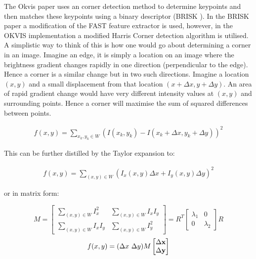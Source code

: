 \documentclass[11pt,twoside]{report}
\begin{document}
The Okvis \cite{Okvis_1} paper uses an corner detection method to determine keypoints and then matches these keypoints using a binary descriptor (BRISK \cite{BRISK}). In the BRISK paper a modification of the FAST feature extractor is used, however, in the OKVIS implementation a modified Harris Corner detection algorithm is utilised. A simplistic way to think of this is how one would go about determining a corner in an image. Imagine an edge, it is simply a location on an image where the brightness gradient changes rapidly in one direction (perpendicular to the edge). Hence a corner is a similar change but in two such directions. Imagine a location $(x,y)$ and a small displacement from that location $(x+ \Delta x, y + \Delta y)$. An area of rapid gradient change would have very different intensity values at $(x,y)$ and surrounding points. Hence a corner will maximise the sum of squared differences between points.

\begin{equation}
\begin{aligned}
f(x,y) = \sum_{x_{k},y_{k} \in W} (I(x_{k},y_{k}) - I(x_{k} + \Delta x,y_{k} + \Delta y))^{2}
\end{aligned}
\end{equation}

This can be further distilled by the Taylor expansion to:

\begin{equation}
\begin{aligned}
f(x,y) = \sum_{(x,y)\in W} (I_{x}(x,y) \Delta x + I_{y}(x,y) \Delta y )^{2}
\end{aligned}
\end{equation}

or in matrix form:

\begin{equation}
M = 
\begin{bmatrix}
\sum_{(x,y) \in W} I_{x}^{2} & \sum_{(x,y) \in W} I_{x}I_{y} \\
\sum_{(x,y)\in W} I_{x}I_{y}& 
\sum_{(x,y)\in W} I_{y}^{2}
\end{bmatrix} = 
R^{T}
\begin{bmatrix}
\lambda_{1} & 0 \\
0 & \lambda_{2}
\end{bmatrix}
R
\end{equation}
\begin{equation}
f(x,y) = (\Delta x \textnormal{ } \Delta y) M 
\begin{bmatrix}
\Delta \mathbf{x} \\
\Delta \mathbf{y}
\end{bmatrix}
\end{equation}
\end{document}

